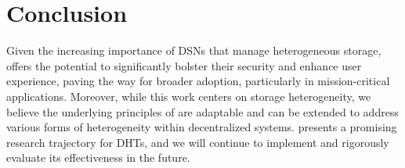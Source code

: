 \section{Conclusion}
Given the increasing importance of DSNs that manage heterogeneous storage, \dht offers the potential to significantly bolster their security and enhance user experience, paving the way for broader adoption, particularly in mission-critical applications.
Moreover, while this work centers on storage heterogeneity, we believe the underlying principles of \dht are adaptable and can be extended to address various forms of heterogeneity within decentralized systems.
\dht presents a promising research trajectory for DHTs, and we will continue to implement and rigorously evaluate its effectiveness in the future.
